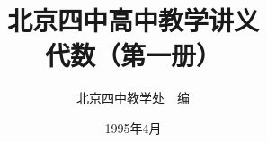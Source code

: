 \documentclass[b5paper, openany]{ctexbook}
\theoremstyle{plain}
\begin{document}
\title{\Huge\bfseries 北京四中高中教学讲义\\代数（第一册）}



\author{\Large 北京四中教学处~~编}
\date{\Large 1995年4月}

\maketitle




\frontmatter


\tableofcontents


\mainmatter

 

 
 
\backmatter


% 
\end{document}
